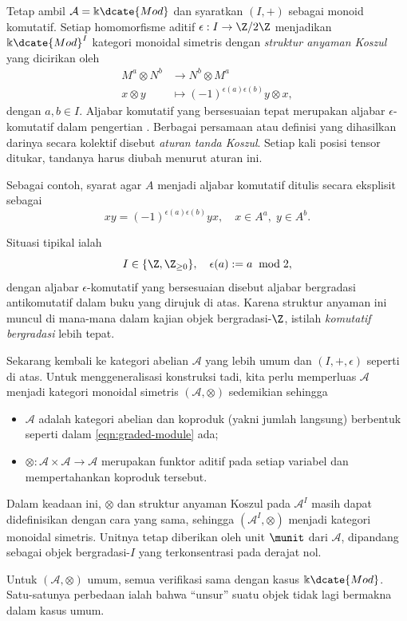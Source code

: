\begin{contoh}
	Tetap ambil $\mathcal{A}=\Bbbk\dcate{Mod}$ dan syaratkan $(I,+)$ sebagai
	monoid komutatif. Setiap homomorfisme aditif
	$\epsilon:I\to\Z/2\Z$ menjadikan $\Bbbk\dcate{Mod}^I$ kategori monoidal
	simetris dengan \emph{struktur anyaman Koszul} yang dicirikan oleh
	\begin{equation}\label{eqn:Koszul-braiding}\begin{aligned}
		M^a \otimes N^b & \to N^b \otimes M^a \\
		x \otimes y & \mapsto (-1)^{\epsilon(a)\epsilon(b)} y \otimes x ,
	\end{aligned}\end{equation}
	dengan $a,b\in I$. Aljabar komutatif yang bersesuaian tepat merupakan
	aljabar $\epsilon$-komutatif dalam pengertian
	\cite[Definisi 7.4.3]{Li1}. Berbagai persamaan atau definisi yang dihasilkan
	darinya secara kolektif disebut \emph{aturan tanda Koszul}. Setiap kali
	posisi tensor ditukar, tandanya harus diubah menurut aturan ini.
	
	Sebagai contoh, syarat agar $A$ menjadi aljabar komutatif ditulis secara
	eksplisit sebagai
	\[ x y = (-1)^{\epsilon(a) \epsilon(b)} yx, \quad x \in A^a, \; y \in A^b. \]
	
	Situasi tipikal ialah
	\[ I \in \{\Z, \Z_{\geq 0} \}, \quad \epsilon(a) := a \;\bmod 2 , \]
	dengan aljabar $\epsilon$-komutatif yang bersesuaian disebut aljabar
	bergradasi antikomutatif dalam buku yang dirujuk di atas. Karena struktur
	anyaman ini muncul di mana-mana dalam kajian objek bergradasi-$\Z$, istilah
	\emph{komutatif bergradasi} lebih tepat.
	
	Sekarang kembali ke kategori abelian $\mathcal{A}$ yang lebih umum dan
	$(I,+,\epsilon)$ seperti di atas. Untuk menggeneralisasi konstruksi tadi,
	kita perlu memperluas $\mathcal{A}$ menjadi kategori monoidal simetris
	$(\mathcal{A},\otimes)$ sedemikian sehingga
	\begin{itemize}
		\item $\mathcal{A}$ adalah kategori abelian dan koproduk (yakni jumlah langsung) berbentuk seperti dalam \eqref{eqn:graded-module} ada;
		\item $\otimes:\mathcal{A}\times\mathcal{A}\to\mathcal{A}$ merupakan funktor aditif pada setiap variabel dan mempertahankan koproduk tersebut.
	\end{itemize}
	Dalam keadaan ini, $\otimes$ dan struktur anyaman Koszul pada
	$\mathcal{A}^I$ masih dapat didefinisikan dengan cara yang sama, sehingga
	$(\mathcal{A}^I,\otimes)$ menjadi kategori monoidal simetris. Unitnya tetap
	diberikan oleh unit $\munit$ dari $\mathcal{A}$, dipandang sebagai objek
	bergradasi-$I$ yang terkonsentrasi pada derajat nol.
	
	Untuk $(\mathcal{A},\otimes)$ umum, semua verifikasi sama dengan kasus
	$\Bbbk\dcate{Mod}$. Satu-satunya perbedaan ialah bahwa ``unsur'' suatu objek
	tidak lagi bermakna dalam kasus umum.
\end{contoh}

